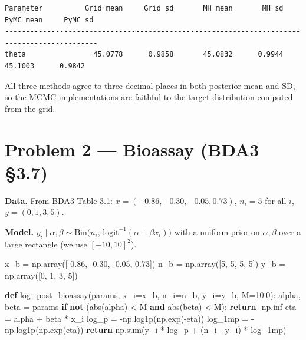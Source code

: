 \documentclass[
  letterpaper,
  DIV=11,
  numbers=noendperiod]{scrartcl}
\newenvironment{Shaded}{\begin{snugshade}}{\end{snugshade}}
\newcommand{\BuiltInTok}[1]{\textcolor[rgb]{0.00,0.23,0.31}{#1}}
\newcommand{\ControlFlowTok}[1]{\textcolor[rgb]{0.00,0.23,0.31}{\textbf{#1}}}
\newcommand{\DecValTok}[1]{\textcolor[rgb]{0.68,0.00,0.00}{#1}}
\newcommand{\FloatTok}[1]{\textcolor[rgb]{0.68,0.00,0.00}{#1}}
\newcommand{\KeywordTok}[1]{\textcolor[rgb]{0.00,0.23,0.31}{\textbf{#1}}}
\newcommand{\NormalTok}[1]{\textcolor[rgb]{0.00,0.23,0.31}{#1}}
\newcommand{\OperatorTok}[1]{\textcolor[rgb]{0.37,0.37,0.37}{#1}}
\begin{document}
\begin{verbatim}
Parameter          Grid mean     Grid sd       MH mean       MH sd     PyMC mean     PyMC sd
--------------------------------------------------------------------------------------------
theta                45.0778      0.9858       45.0832      0.9944       45.1003      0.9842
\end{verbatim}

All three methods agree to three decimal places in both posterior mean
and SD, so the MCMC implementations are faithful to the target
distribution computed from the grid.

\newpage

\section{Problem 2 --- Bioassay (BDA3
§3.7)}\label{problem-2-bioassay-bda3-3.7}

\textbf{Data.} From BDA3 Table 3.1: \(x = (-0.86, -0.30, -0.05, 0.73)\),
\(n_i = 5\) for all \(i\), \(y = (0, 1, 3, 5)\).

\textbf{Model.}
\(y_i \mid \alpha, \beta \sim \text{Bin}\!\bigl(n_i, \,\text{logit}^{-1}(\alpha + \beta x_i)\bigr)\)
with a uniform prior on \(\alpha, \beta\) over a large rectangle (we use
\([-10, 10]^2\)).

\begin{Shaded}
\begin{Highlighting}[]
\NormalTok{x\_b }\OperatorTok{=}\NormalTok{ np.array([}\OperatorTok{{-}}\FloatTok{0.86}\NormalTok{, }\OperatorTok{{-}}\FloatTok{0.30}\NormalTok{, }\OperatorTok{{-}}\FloatTok{0.05}\NormalTok{, }\FloatTok{0.73}\NormalTok{])}
\NormalTok{n\_b }\OperatorTok{=}\NormalTok{ np.array([}\DecValTok{5}\NormalTok{, }\DecValTok{5}\NormalTok{, }\DecValTok{5}\NormalTok{, }\DecValTok{5}\NormalTok{])}
\NormalTok{y\_b }\OperatorTok{=}\NormalTok{ np.array([}\DecValTok{0}\NormalTok{, }\DecValTok{1}\NormalTok{, }\DecValTok{3}\NormalTok{, }\DecValTok{5}\NormalTok{])}

\KeywordTok{def}\NormalTok{ log\_post\_bioassay(params, x\_i}\OperatorTok{=}\NormalTok{x\_b, n\_i}\OperatorTok{=}\NormalTok{n\_b, y\_i}\OperatorTok{=}\NormalTok{y\_b, M}\OperatorTok{=}\FloatTok{10.0}\NormalTok{):}
\NormalTok{    alpha, beta }\OperatorTok{=}\NormalTok{ params}
    \ControlFlowTok{if} \KeywordTok{not}\NormalTok{ (}\BuiltInTok{abs}\NormalTok{(alpha) }\OperatorTok{\textless{}}\NormalTok{ M }\KeywordTok{and} \BuiltInTok{abs}\NormalTok{(beta) }\OperatorTok{\textless{}}\NormalTok{ M):}
        \ControlFlowTok{return} \OperatorTok{{-}}\NormalTok{np.inf}
\NormalTok{    eta }\OperatorTok{=}\NormalTok{ alpha }\OperatorTok{+}\NormalTok{ beta }\OperatorTok{*}\NormalTok{ x\_i}
\NormalTok{    log\_p   }\OperatorTok{=} \OperatorTok{{-}}\NormalTok{np.log1p(np.exp(}\OperatorTok{{-}}\NormalTok{eta))}
\NormalTok{    log\_1mp }\OperatorTok{=} \OperatorTok{{-}}\NormalTok{np.log1p(np.exp(eta))}
    \ControlFlowTok{return}\NormalTok{ np.}\BuiltInTok{sum}\NormalTok{(y\_i }\OperatorTok{*}\NormalTok{ log\_p }\OperatorTok{+}\NormalTok{ (n\_i }\OperatorTok{{-}}\NormalTok{ y\_i) }\OperatorTok{*}\NormalTok{ log\_1mp)}
\end{Highlighting}
\end{Shaded}
\end{document}
